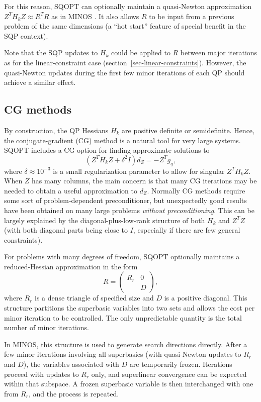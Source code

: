 \documentclass[draft,leqno,onefignum,onetabnum]{siamltex}
\def\T{^T\!}
\def\Z{_{\scriptscriptstyle Z}}
\def\MINOS {{\small MINOS}}
\def\SQOPT {{\small SQOPT}}
\newcommand{\pmat}[1]{\begin{pmatrix}#1\end{pmatrix}}
\begin{document}
For this reason, \SQOPT{} can optionally maintain
a quasi-Newton approximation $Z\T H_k Z \approx R\T R$
as in MINOS \cite{MurS78}.  It also allows $R$ to be
input from a previous problem of the same dimensions
(a ``hot start'' feature of special benefit in the
SQP context).

Note that the SQP updates to $H_k$ could be applied to $R$ between
major iterations as for the linear-constraint case
(section~\ref{sec-linear-constraints}).  However, the quasi-Newton updates
during the first few minor iterations of each QP should achieve a
similar effect.


\subsection{CG methods} \label{sec-CG}

By construction, the QP Hessians $H_k$ are positive definite
or semidefinite.  Hence, the conjugate-gradient (CG) method is
a natural tool for very large systems.  \SQOPT{} includes a CG option
for finding approximate solutions to
\begin{equation} \label{eqn-CG}
 (Z\T H_k Z + \delta^2 I) d\Z = - Z\T g_q,
\end{equation}
where $\delta \approx 10^{-3}$ is a small regularization parameter to
allow for singular $Z\T H_k Z$.  When $Z$ has many columns, the main
concern is that many CG iterations may be needed to obtain a useful
approximation to $d\Z$.
Normally CG methods require some sort of problem-dependent
preconditioner, but unexpectedly good results have been
obtained on many large problems \emph{without preconditioning}.
This can be largely explained by the diagonal-plus-low-rank structure
of both $H_k$ and $Z\T Z$ (with both diagonal parts being close to $I$,
especially if there are few general constraints).

For problems with many degrees of freedom, \SQOPT{} optionally
maintains a reduced-Hessian approximation in the form
  \begin{equation} \label{eqn:RD}
    R = \pmat{ R_r & 0
             \\    & D},
  \end{equation}
where $R_r$ is a dense triangle of specified size and $D$ is
a positive diagonal.
This structure partitions the superbasic variables into two sets
and allows the cost per minor iteration to be controlled.
The only unpredictable quantity is the total number of minor iterations.

In \MINOS{}, this structure is used to generate search directions
directly.  After a few minor iterations involving all superbasics
(with quasi-Newton updates to $R_r$ and $D$), the variables associated
with $D$ are temporarily frozen.  Iterations proceed with updates to
$R_r$ only, and superlinear convergence can be expected within that
subspace.  A frozen superbasic variable is then interchanged with one
from $R_r$, and the process is repeated.
\end{document}
